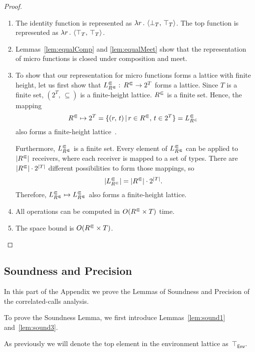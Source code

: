 \efficient*
\begin{proof}
\leavevmode
  \begin{enumerate}
    \item The identity function is represented as $\lambda r\,.\,\left\langle \bot_T,\,\top_T\right\rangle$. 
    The top function is represented as $\lambda r\,.\,\left\langle \top_T,\,\top_T\right\rangle$.
    \item Lemmas~\ref{lem:equalComp} and \ref{lem:equalMeet} show that the representation of micro functions is closed under composition and meet.
    \item To show that our representation for micro functions forms a lattice with finite height, let us first show that $L^\Subset_{R^\Subset}:\,{R^\Subset}\to2^T$ forms a lattice. Since $T$ is a finite set, $(2^T,\,\subseteq)$ is a finite-height lattice. ${R^\Subset}$ is a finite set. Hence, the mapping
    \[
      {R^\Subset}\mapsto2^T=\{(r,\,t)\,|\,r\in {R^\Subset},\,t\in 2^T\}=L^\Subset_{R^\Subset}
    \]        
    also forms a finite-height lattice~\cite{nielson1999principles}. 
    
    Furthermore, $L^\Subset_{R^\Subset}$ is a finite set. 
    Every element of $L^\Subset_{R^\Subset}$ can be applied to $|{R^\Subset}|$ receivers, where each receiver is mapped to a set of types. There are $|{R^\Subset}|\cdot2^{|T|}$ different possibilities to form those mappings, so
    \[
      |L^\Subset_{R^\Subset}|=|{R^\Subset}|\cdot2^{|T|}.
    \]
    Therefore, $L^\Subset_{R^\Subset}\mapsto L^\Subset_{R^\Subset}$ also forms a finite-height lattice.
    \item All operations can be computed in $O({R^\Subset}\times T)$ time. %
    \item The space bound is $O({R^\Subset}\times T)$.\qedhere
  \end{enumerate}
\end{proof}

\subsection*{Soundness and Precision}

In this part of the Appendix we prove the Lemmas of Soundness and Precision of the correlated-calls analysis.

To prove the Soundness Lemma, we first introduce Lemmas~\ref{lem:sound1} and~\ref{lem:sound3}.

As previously we will denote the top element in the environment lattice as~$\top_\textsf{Env}$.

